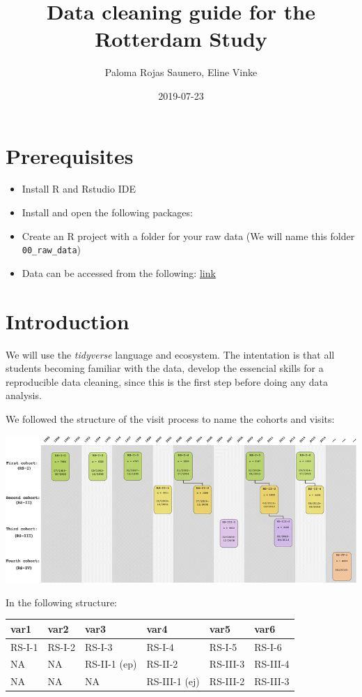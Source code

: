 \documentclass[]{book}
\title{Data cleaning guide for the Rotterdam Study}
\author{Paloma Rojas Saunero, Eline Vinke}
\date{2019-07-23}
\begin{document}
\maketitle

{
\setcounter{tocdepth}{1}
\tableofcontents
}
\hypertarget{prerequisites}{%
\chapter{Prerequisites}\label{prerequisites}}

\begin{itemize}
\item
  Install R and Rstudio IDE
\item
  Install and open the following packages:
\item
  Create an R project with a folder for your raw data (We will name this folder \texttt{00\_raw\_data})
\item
  Data can be accessed from the following: \href{https://epi-wiki.erasmusmc.nl/wiki/ergowiki/index.php/Ergobasics}{link}
\end{itemize}

\hypertarget{intro}{%
\chapter{Introduction}\label{intro}}

We will use the \emph{tidyverse} language and ecosystem.
The intentation is that all students becoming familiar with the data, develop the essencial skills for a reproducible data cleaning, since this is the first step before doing any data analysis.

We followed the structure of the visit process to name the cohorts and visits:

\includegraphics[width=1\linewidth]{./rs}

In the following structure:

\begin{tabular}{l|l|l|l|l|l}
\hline
var1 & var2 & var3 & var4 & var5 & var6\\
\hline
RS-I-1 & RS-I-2 & RS-I-3 & RS-I-4 & RS-I-5 & RS-I-6\\
\hline
NA & NA & RS-II-1 (ep) & RS-II-2 & RS-III-3 & RS-III-4\\
\hline
NA & NA & NA & RS-III-1 (ej) & RS-III-2 & RS-III-3\\
\hline
\end{tabular}
\end{document}
